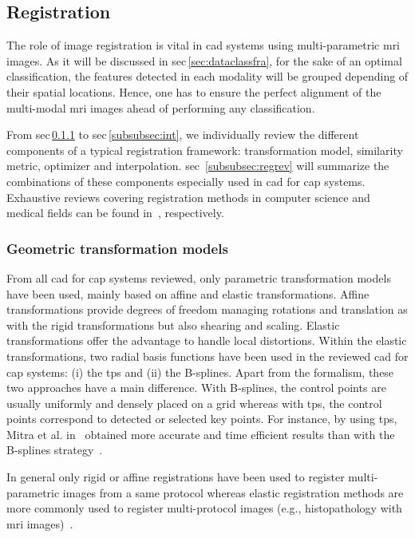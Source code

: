 \subsection{Registration} \label{subsec:registration}

The role of image registration is vital in \ac{cad} systems using multi-parametric \ac{mri} images. As it will be discussed in \ac{sec}\,\ref{sec:dataclassfra}, for the sake of an optimal classification, the features detected in each modality will be grouped depending of their spatial locations. Hence, one has to ensure the perfect alignment of the multi-modal \ac{mri} images ahead of performing any classification.

From \ac{sec}\,\ref{subsubsec:geotra} to \ac{sec}\,\ref{subsubsec:int}, we individually review the different components of a typical registration framework: transformation model, similarity metric, optimizer and interpolation. \Acl{sec}~\ref{subsubsec:regrev} will summarize the combinations of these components especially used in \ac{cad} for \ac{cap} systems. Exhaustive reviews covering registration methods in computer science and medical fields can be found in~\cite{Maintz1998,Zitova2003}, respectively.

\subsubsection{Geometric transformation models}\label{subsubsec:geotra}

From all \ac{cad} for \ac{cap} systems reviewed, only parametric transformation models have been used, mainly based on affine and elastic transformations. Affine transformations provide degrees of freedom managing rotations and translation as with the rigid transformations but also shearing and scaling. Elastic transformations offer the advantage to handle local distortions. Within the elastic transformations, two radial basis functions have been used in the reviewed \ac{cad} for \ac{cap} systems: (i) the \ac{tps} and (ii) the B-splines. Apart from the formalism, these two approaches have a main difference. With B-splines, the control points are usually uniformly and densely placed on a grid whereas with \ac{tps}, the control points correspond to detected or selected key points. For instance, by using \ac{tps}, Mitra et al. in~\cite{Mitra2011} obtained more accurate and time efficient results than with the B-splines strategy~\cite{Mitra2012a}.

In general only rigid or affine registrations have been used to register multi-parametric images from a same protocol whereas elastic registration methods are more commonly used to register multi-protocol images (e.g., histopathology with \ac{mri} images)~\cite{Toth2008,Toth2009}.

